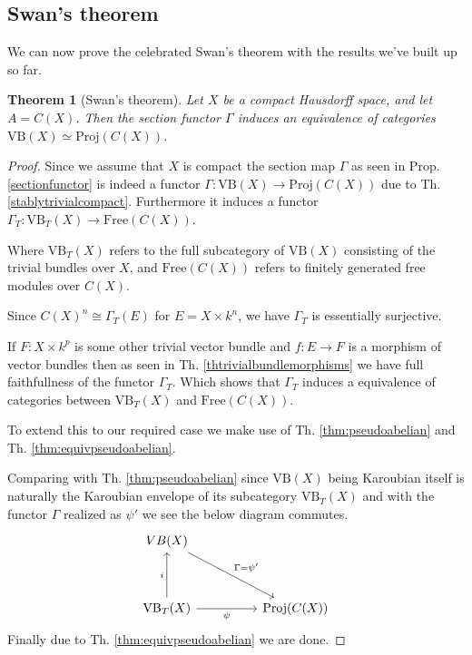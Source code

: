\documentclass[12pt]{article}
\numberwithin{equation}{section}
\newcounter{dummy} \numberwithin{dummy}{section}
\newtheorem{theorem}[dummy]{Theorem}
\begin{document}
	

	\subsection{Swan's theorem}
	
	We can now prove the celebrated Swan's theorem with the results we've built up so far.
	\begin{theorem}[Swan's theorem]\label{thm:serreswan}
		Let $X$ be a compact Hausdorff space, and let $A = C(X)$. Then the section functor $\Gamma$ induces an equivalence of categories $\mathrm{VB}(X) \simeq \mathrm{Proj}(C(X))$.
	\end{theorem}
	
	\begin{proof}
		Since we assume that $X$ is compact the section map $\Gamma$ as seen in Prop. \ref{sectionfunctor} is indeed a functor $\Gamma: \mathrm{VB}(X) \to \mathrm{Proj}(C(X))$ due to Th. \ref{stablytrivialcompact}. Furthermore it induces a functor $\Gamma_T: \mathrm{VB}_{T}(X) \to \mathrm{Free}(C(X))$.
		
		Where $\mathrm{VB}_T(X)$ refers to the full subcategory of $\mathrm{VB}(X)$ consisting of the trivial bundles over $X$, and $\mathrm{Free}(C(X))$ refers to finitely generated free modules over $C(X)$.
		
		Since $C(X)^n \cong \Gamma_T(E)$ for $E=X\times k^n$, we have $\Gamma_T$ is essentially surjective.
		
		If $F:X \times k^p$ is some other trivial vector bundle and $f:E \to F$ is a morphism of vector bundles then as seen in Th. \ref{thtrivialbundlemorphisms} we have full faithfullness of the functor $\Gamma_T$. Which shows that $\Gamma_T$ induces a equivalence of categories between $\mathrm{VB}_T(X) $ and $\mathrm{Free}(C(X))$.
		
		To extend this to our required case we make use of Th. \ref{thm:pseudoabelian} and Th. \ref{thm:equivpseudoabelian}.
		
		Comparing with Th. \ref{thm:pseudoabelian} since $\mathrm{VB}(X)$ being Karoubian itself is naturally the Karoubian envelope of its subcategory $\mathrm{VB}_T(X)$ and with the functor $\Gamma$ realized as $\psi'$ we see the below diagram commutes.
		\[\begin{tikzcd}
			{VB(X)} \\
			\\
			{\mathrm{VB}_T(X)} && {\mathrm{Proj}(C(X))}
			\arrow["{\Gamma =\psi'}", from=1-1, to=3-3]
			\arrow["i", from=3-1, to=1-1]
			\arrow["\psi"', from=3-1, to=3-3]
		\end{tikzcd}\]
		Finally due to Th. \ref{thm:equivpseudoabelian} we are done.
		

\end{proof}
\end{document}
